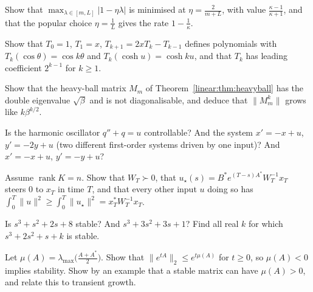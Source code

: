 \begin{exercise}[$\star$]\label{linear:ex:gdstep}
Show that $\max_{\lambda\in[m,L]}|1-\eta\lambda|$ is minimised at $\eta=\frac2{m+L}$, with value $\frac{\kappa-1}{\kappa+1}$, and that the
popular choice $\eta=\frac1L$ gives the rate $1-\frac1\kappa$.
\end{exercise}

\begin{exercise}[$\star\star$]\label{linear:ex:chebyshevrec}
Show that $T_0=1$, $T_1=x$, $T_{k+1}=2xT_k-T_{k-1}$ defines polynomials with $T_k(\cos\theta)=\cos k\theta$ and $T_k(\cosh u)=\cosh ku$, and that
$T_k$ has leading coefficient $2^{k-1}$ for $k\ge1$.
\end{exercise}

\begin{exercise}[$\star\star$]\label{linear:ex:heavyjordan}
Show that the heavy-ball matrix $M_m$ of Theorem~\ref{linear:thm:heavyball} has the double eigenvalue $\sqrt\beta$ and is not diagonalisable,
and deduce that $\|M_m^k\|$ grows like $k\beta^{k/2}$.
\end{exercise}

\begin{exercise}[$\star$]\label{linear:ex:kalmanosc}
Is the harmonic oscillator $q''+q=u$ controllable? And the system $x'=-x+u$, $y'=-2y+u$ (two different first-order systems driven by
one input)? And $x'=-x+u$, $y'=-y+u$?
\end{exercise}

\begin{exercise}[$\star\star$]\label{linear:ex:mininput}
Assume $\operatorname{rank}K=n$. Show that $W_T\succ0$, that $u_\star(s)=B^*e^{(T-s)A^*}W_T^{-1}x_T$ steers $0$ to $x_T$ in time $T$, and that every
other input $u$ doing so has $\int_0^T\|u\|^2\ge\int_0^T\|u_\star\|^2=x_T^*W_T^{-1}x_T$.
\end{exercise}

\begin{exercise}[$\star$]\label{linear:ex:routh}
Is $s^3+s^2+2s+8$ stable? And $s^3+3s^2+3s+1$? Find all real $k$ for which $s^3+2s^2+s+k$ is stable.
\end{exercise}

\begin{exercise}[$\star\star$]\label{linear:ex:lognorm}
Let $\mu(A)=\lambda_{\max}\bigl(\frac{A+A^*}2\bigr)$. Show that $\|e^{tA}\|_2\le e^{t\mu(A)}$ for $t\ge0$, so $\mu(A)<0$ implies stability.
Show by an example that a stable matrix can have $\mu(A)>0$, and relate this to transient growth.
\end{exercise}

